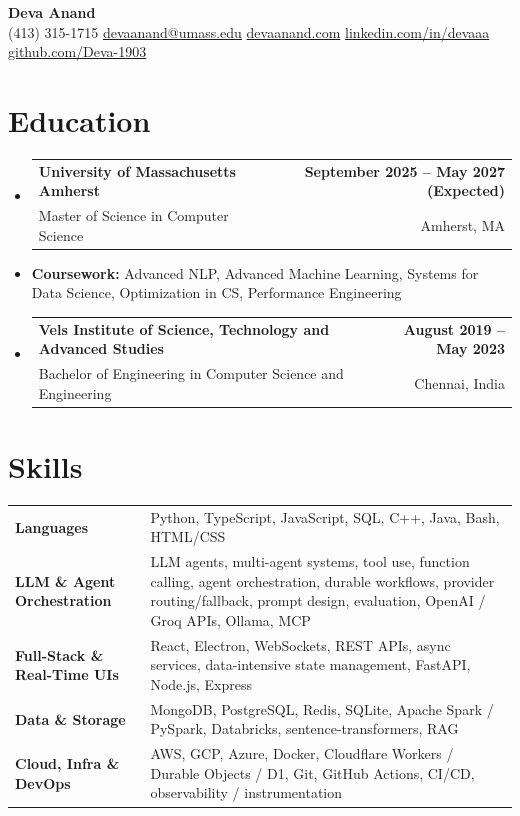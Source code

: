 \documentclass[letterpaper,10pt]{article}
\makeatletter
\newcommand{\resumeSubheading}[4]{
  \vspace{1pt}\item
    \begin{tabular*}{0.985\textwidth}[t]{l@{\extracolsep{\fill}}r}
      \textbf{#1} & \textbf{\small #2} \\
      {\small\color{ResumeSlate} #3} & {\small\color{ResumeSlate} #4} \\
    \end{tabular*}\vspace{-6pt}
}
\newcommand{\resumeSubItem}[1]{\item[]\small{#1\vspace{-1pt}}}
\newcommand{\resumeSubHeadingListStart}{\begin{itemize}[leftmargin=0.0in, label={}, itemsep=2pt, topsep=2pt]}
\newcommand{\resumeSubHeadingListEnd}{\end{itemize}}
\makeatother
\begin{document}
\begin{center}
    {\LARGE \bfseries \textcolor{ResumeNavy}{Deva Anand}} \\ \vspace{4pt}
    \small
    (413) 315-1715 \enspace\textbar\enspace
    \href{mailto:devaanand@umass.edu}{devaanand@umass.edu} \enspace\textbar\enspace
    \href{https://devaanand.com}{devaanand.com} \enspace\textbar\enspace
    \href{https://linkedin.com/in/devaaa/}{linkedin.com/in/devaaa} \enspace\textbar\enspace
    \href{https://github.com/Deva-1903}{github.com/Deva-1903}
    \vspace{-6pt}
\end{center}
\section{Education}
\resumeSubHeadingListStart
  \resumeSubheading
    {University of Massachusetts Amherst}{September 2025 -- May 2027 (Expected)}
    {Master of Science in Computer Science}{Amherst, MA}
  \resumeSubItem{\textbf{Coursework:} Advanced NLP, Advanced Machine Learning, Systems for Data Science, Optimization in CS, Performance Engineering}
  \resumeSubheading
    {Vels Institute of Science, Technology and Advanced Studies}{August 2019 -- May 2023}
    {Bachelor of Engineering in Computer Science and Engineering}{Chennai, India}
\resumeSubHeadingListEnd
\vspace{-4pt}
\section{Skills}
{\small
\begin{tabularx}{0.985\textwidth}{@{}>{\bfseries}p{1.55in}@{\hspace{0.45em}}X@{}}
  Languages & Python, TypeScript, JavaScript, SQL, C++, Java, Bash, HTML/CSS \\
  LLM \& Agent Orchestration & LLM agents, multi-agent systems, tool use, function calling, agent orchestration, durable workflows, provider routing/fallback, prompt design, evaluation, OpenAI / Groq APIs, Ollama, MCP \\
  Full-Stack \& Real-Time UIs & React, Electron, WebSockets, REST APIs, async services, data-intensive state management, FastAPI, Node.js, Express \\
  Data \& Storage & MongoDB, PostgreSQL, Redis, SQLite, Apache Spark / PySpark, Databricks, sentence-transformers, RAG \\
  Cloud, Infra \& DevOps & AWS, GCP, Azure, Docker, Cloudflare Workers / Durable Objects / D1, Git, GitHub Actions, CI/CD, observability / instrumentation \\
\end{tabularx}
}
\vspace{-4pt}
\end{document}
